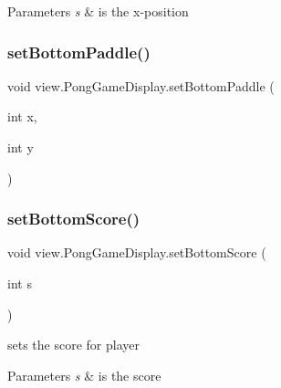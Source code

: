 \begin{DoxyParams}{Parameters}
{\em s} & is the x-\/position \\
\hline
\end{DoxyParams}
\hypertarget{classview_1_1_pong_game_display_aa2f0ba3a3f8bc84bd079302904a57133}{}\label{classview_1_1_pong_game_display_aa2f0ba3a3f8bc84bd079302904a57133} 
\subsubsection{\texorpdfstring{set\+Bottom\+Paddle()}{setBottomPaddle()}}
{\footnotesize\ttfamily void view.\+Pong\+Game\+Display.\+set\+Bottom\+Paddle (\begin{DoxyParamCaption}\item[{int}]{x,  }\item[{int}]{y }\end{DoxyParamCaption})}

\hypertarget{classview_1_1_pong_game_display_aa1ef677f1bae92a51750732099b1609a}{}\label{classview_1_1_pong_game_display_aa1ef677f1bae92a51750732099b1609a} 
\subsubsection{\texorpdfstring{set\+Bottom\+Score()}{setBottomScore()}}
{\footnotesize\ttfamily void view.\+Pong\+Game\+Display.\+set\+Bottom\+Score (\begin{DoxyParamCaption}\item[{int}]{s }\end{DoxyParamCaption})}



sets the score for player 


\begin{DoxyParams}{Parameters}
{\em s} & is the score \\
\hline
\end{DoxyParams}
\hypertarget{classview_1_1_pong_game_display_ac40ce3811b6118c530980d38aa48ec64}{}\label{classview_1_1_pong_game_display_ac40ce3811b6118c530980d38aa48ec64} 
